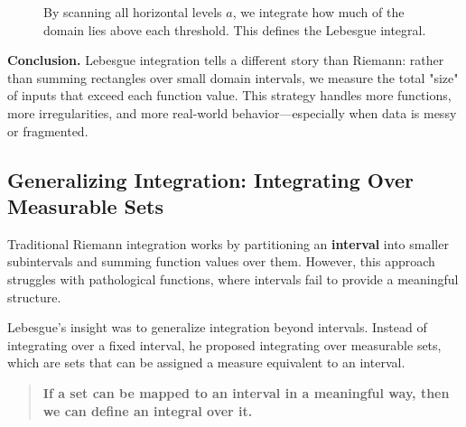 \begin{figure}[H]
\centering
{}
\caption{By scanning all horizontal levels $a$, we integrate how much of the domain lies above each threshold. This defines the Lebesgue integral.}
\end{figure}

\vspace{1em}
\noindent
\textbf{Conclusion.} Lebesgue integration tells a different story than Riemann: rather than summing rectangles over small domain intervals, we measure the total "size" of inputs that exceed each function value. This strategy handles more functions, more irregularities, and more real-world behavior—especially when data is messy or fragmented.





\subsection{Generalizing Integration: Integrating Over Measurable Sets}

Traditional Riemann integration works by partitioning an \textbf{interval} into smaller subintervals and summing function values over them. However, this approach struggles with pathological functions, where intervals fail to provide a meaningful structure.

Lebesgue's insight was to generalize integration beyond intervals. Instead of integrating over a fixed interval, he proposed integrating over measurable sets, which are sets that can be assigned a measure equivalent to an interval.

\begin{quote}
\textbf{If a set can be mapped to an interval in a meaningful way, then we can define an integral over it.}
\end{quote}

